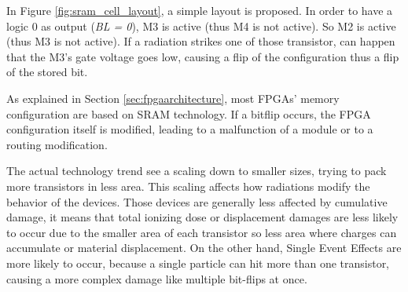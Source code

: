 In Figure \ref{fig:sram_cell_layout}, a simple layout is proposed. In order to have a logic 0 as output (\textit{BL = 0}), M3 is active (thus M4 is not active). So M2 is active (thus M3 is not active). If a radiation strikes one of those transistor, can happen that the M3's gate voltage goes low, causing a flip of the configuration thus a flip of the stored bit. \bigskip

As explained in Section \ref{sec:fpgaarchitecture}, most FPGAs' memory configuration are based on SRAM technology. If a bitflip occurs, the FPGA configuration itself is modified, leading to a malfunction of a module or to a routing modification.\bigskip

The actual technology trend see a scaling down to smaller sizes, trying to pack more transistors in less area. This scaling affects how radiations modify the behavior of the devices. Those devices are generally less affected by cumulative damage, it means that total ionizing dose or displacement damages are less likely to occur due to the smaller area of each transistor so less area where charges can accumulate or material displacement. On the other hand, Single Event Effects are more likely to occur, because a single particle can hit more than one transistor, causing a more complex damage like multiple bit-flips at once. 
